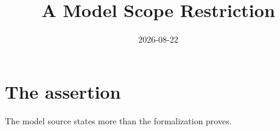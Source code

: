 \documentclass{article}
\title{A Model Scope Restriction}
\date{2026-08-22}
\begin{document}
\maketitle
{}
\section{The assertion}
The model source states more than the formalization proves.
\end{document}
